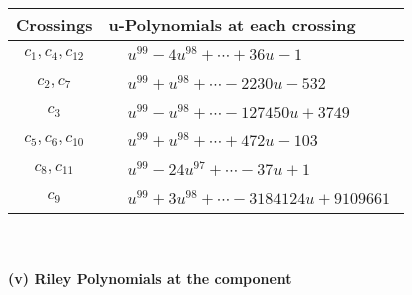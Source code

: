 \documentclass[1p]{elsarticle_modified}
\theoremstyle{definition}
\begin{document}
\begin{tabular}{m{50pt}|m{274pt}}
Crossings & \hspace{64pt}u-Polynomials at each crossing \\
\hline $$\begin{aligned}c_{1},c_{4},c_{12}\end{aligned}$$&$\begin{aligned}
&u^{99}-4 u^{98}+\cdots+36 u-1
\end{aligned}$\\
\hline $$\begin{aligned}c_{2},c_{7}\end{aligned}$$&$\begin{aligned}
&u^{99}+u^{98}+\cdots-2230 u-532
\end{aligned}$\\
\hline $$\begin{aligned}c_{3}\end{aligned}$$&$\begin{aligned}
&u^{99}- u^{98}+\cdots-127450 u+3749
\end{aligned}$\\
\hline $$\begin{aligned}c_{5},c_{6},c_{10}\end{aligned}$$&$\begin{aligned}
&u^{99}+u^{98}+\cdots+472 u-103
\end{aligned}$\\
\hline $$\begin{aligned}c_{8},c_{11}\end{aligned}$$&$\begin{aligned}
&u^{99}-24 u^{97}+\cdots-37 u+1
\end{aligned}$\\
\hline $$\begin{aligned}c_{9}\end{aligned}$$&$\begin{aligned}
&u^{99}+3 u^{98}+\cdots-3184124 u+9109661
\end{aligned}$\\
\hline
\end{tabular}\\~\\
\newpage\renewcommand{\arraystretch}{1}
\flushleft \textbf{(v) Riley Polynomials at the component}\newline \\
\end{document}
